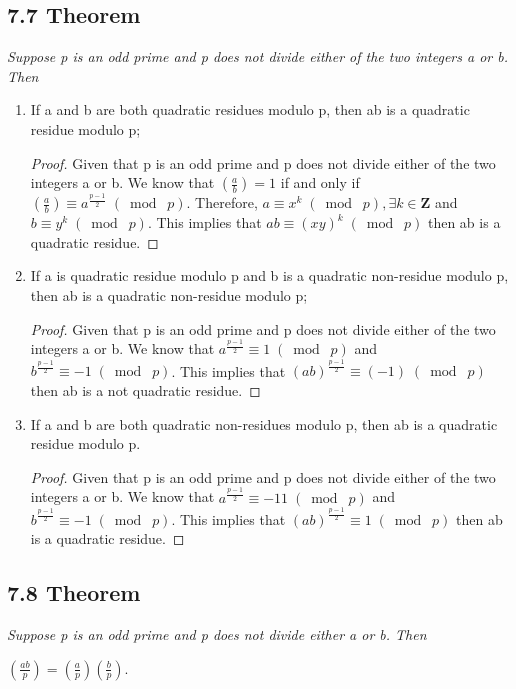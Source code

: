 \documentclass{article}
\begin{document}
\subsection*{7.7 Theorem} 
\quad \textit{Suppose p is an odd prime and p does not divide either of the two integers a or b. Then}
\begin{enumerate}
    \item If a and b are both quadratic residues modulo p, then ab is a quadratic residue modulo p;
    \begin{proof}
    Given that p is an odd prime and p does not divide either of the two integers a or b. We know that $(\frac{a}{b}) = 1$ if and only if $(\frac{a}{b}) \equiv a^{\frac{p-1}{2}} \;(\bmod\; p)$. Therefore, $a \equiv x^k \;(\bmod\; p), \exists  k \in \mathbf{Z}$ and $b \equiv y^k \;(\bmod\; p)$. This implies that $ab \equiv (xy)^k \;(\bmod\; p)$ then ab is a quadratic residue.
    \end{proof}
    \item If a is quadratic residue modulo p and b is a quadratic non-residue modulo p, then ab is a quadratic non-residue modulo p;
    \begin{proof}
    Given that p is an odd prime and p does not divide either of the two integers a or b. We know that $a^{\frac{p-1}{2}} \equiv 1 \;(\bmod\; p)$ and $b^{\frac{p-1}{2}} \equiv -1 \;(\bmod\; p)$. This implies that $(ab)^{\frac{p-1}{2}} \equiv (-1) \;(\bmod\; p)$ then ab is a not quadratic residue.
    \end{proof}
    \item If a and b are both quadratic non-residues modulo p, then ab is a quadratic residue modulo p.
    \begin{proof}
    Given that p is an odd prime and p does not divide either of the two integers a or b. We know that $a^{\frac{p-1}{2}} \equiv -11 \;(\bmod\; p)$ and $b^{\frac{p-1}{2}} \equiv -1 \;(\bmod\; p)$. This implies that $(ab)^{\frac{p-1}{2}} \equiv 1 \;(\bmod\; p)$ then ab is a quadratic residue.
    \end{proof}
\end{enumerate}

\subsection*{7.8 Theorem} 
\quad \textit{Suppose p is an odd prime and p does not divide either a or b. Then}
\begin{center}
    $(\frac{ab}{p}) = (\frac{a}{p})(\frac{b}{p})$.
\end{center}
\end{document}
